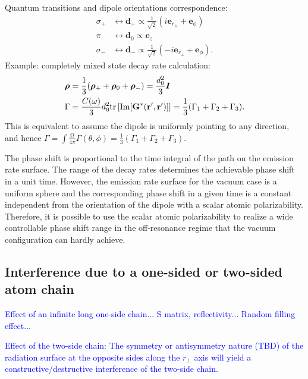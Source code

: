 \documentclass[preprint,aps,pra,onecolumn]{revtex4-1} %
\begin{document}
Quantum transitions and dipole orientations correspondence:
\begin{align}
\sigma_+ &\leftrightarrow \mathbf{d}_+\propto \frac{1}{\sqrt{2}}(i\mathbf{e}_{r\!_\perp}+\mathbf{e}_\phi)\\
\pi &\leftrightarrow \mathbf{d}_0 \propto \mathbf{e}_z\\
\sigma_- &\leftrightarrow \mathbf{d}_-\propto \frac{1}{\sqrt{2}}(-i\mathbf{e}_{r\!_\perp}+\mathbf{e}_\phi).
\end{align}
Example: completely mixed state decay rate calculation:
\begin{align}
\boldsymbol{\rho} &=\frac{1}{3}(\boldsymbol{\rho}_++\boldsymbol{\rho}_0+\boldsymbol{\rho}_-)=\frac{d_0^2}{3}\boldsymbol{I}\\
\Gamma &=\frac{C(\omega)}{3}d_0^2 \mathrm{tr}\left[ \mathrm{Im}[\mathbf{G}^*(\mathbf{r}',\mathbf{r}')] \right]=\frac{1}{3}(\Gamma_1+\Gamma_2+\Gamma_3).
\end{align}
This is equivalent to assume the dipole is uniformly pointing to any direction, and hence
$\Gamma = \int \frac{\mathrm{\Omega}}{4\pi}\Gamma(\theta,\phi)=\frac{1}{3}(\Gamma_1+\Gamma_2+\Gamma_3)$.


The phase shift is proportional to the time integral of the path on the emission rate surface. The range of the decay rates determines the achievable phase shift in a unit time. However, the emission rate surface for the vacuum case is a uniform sphere and the corresponding phase shift in a given time is a constant independent from the orientation of the dipole with a scalar atomic polarizability. Therefore, it is possible to use the scalar atomic polarizability to realize a wide controllable phase shift range in the off-resonance regime that the vacuum configuration can hardly achieve. 


\subsection{Interference due to a one-sided or two-sided atom chain}
\textcolor{blue}{Effect of an infinite long one-side chain... S matrix, reflectivity... Random filling effect...}

\textcolor{blue}{Effect of the two-side chain:
The symmetry or antisymmetry nature (TBD) of the radiation surface at the opposite sides along the $ r\!_\perp $ axis will yield a constructive/destructive interference of the two-side chain.} 
\end{document}
